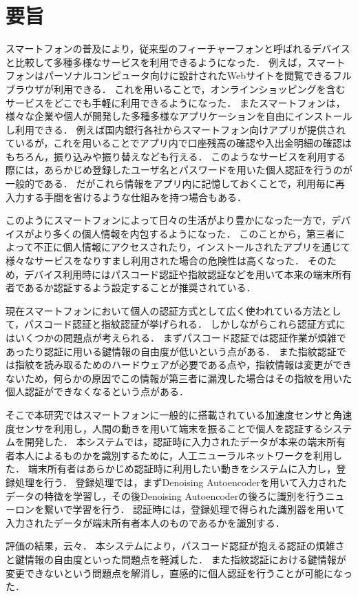 \chapter*{要旨}
スマートフォンの普及により，従来型のフィーチャーフォンと呼ばれるデバイスと比較して多種多様なサービスを利用できるようになった．
例えば，スマートフォンはパーソナルコンピュータ向けに設計されたWebサイトを閲覧できるフルブラウザが利用できる．
これを用いることで，オンラインショッピングを含むサービスをどこでも手軽に利用できるようになった．
またスマートフォンは，様々な企業や個人が開発した多種多様なアプリケーションを自由にインストールし利用できる．
例えば国内銀行各社からスマートフォン向けアプリが提供されているが，これを用いることでアプリ内で口座残高の確認や入出金明細の確認はもちろん，振り込みや振り替えなども行える．
このようなサービスを利用する際には，あらかじめ登録したユーザ名とパスワードを用いた個人認証を行うのが一般的である．
だがこれら情報をアプリ内に記憶しておくことで，利用毎に再入力する手間を省けるような仕組みを持つ場合もある．

このようにスマートフォンによって日々の生活がより豊かになった一方で，デバイスがより多くの個人情報を内包するようになった．
このことから，第三者によって不正に個人情報にアクセスされたり，インストールされたアプリを通じて様々なサービスをなりすまし利用された場合の危険性は高くなった．
そのため，デバイス利用時にはパスコード認証や指紋認証などを用いて本来の端末所有者であるか認証するよう設定することが推奨されている．

現在スマートフォンにおいて個人の認証方式として広く使われている方法として，パスコード認証と指紋認証が挙げられる．
しかしながらこれら認証方式にはいくつかの問題点が考えられる．
まずパスコード認証では認証作業が煩雑であったり認証に用いる鍵情報の自由度が低いという点がある．
また指紋認証では指紋を読み取るためのハードウェアが必要である点や，指紋情報は変更ができないため，何らかの原因でこの情報が第三者に漏洩した場合はその指紋を用いた個人認証ができなくなるという点がある．

そこで本研究ではスマートフォンに一般的に搭載されている加速度センサと角速度センサを利用し，人間の動きを用いて端末を振ることで個人を認証するシステムを開発した．
本システムでは，認証時に入力されたデータが本来の端末所有者本人によるものかを識別するために，人工ニューラルネットワークを利用した．
端末所有者はあらかじめ認証時に利用したい動きをシステムに入力し，登録処理を行う．
登録処理では，まずDenoising Autoencoderを用いて入力されたデータの特徴を学習し，その後Denoising Autoencoderの後ろに識別を行うニューロンを繋いで学習を行う．
認証時には，登録処理で得られた識別器を用いて入力されたデータが端末所有者本人のものであるかを識別する．

評価の結果，云々．
本システムにより，パスコード認証が抱える認証の煩雑さと鍵情報の自由度といった問題点を軽減した．
また指紋認証における鍵情報が変更できないという問題点を解消し，直感的に個人認証を行うことが可能になった．
